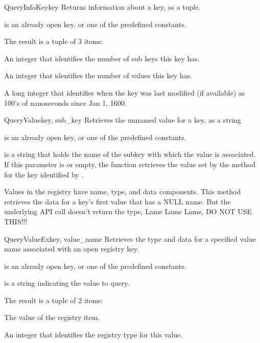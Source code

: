 \begin{funcdesc}{QueryInfoKey}{key}
 Returns information about a key, as a tuple.

  is an already open key, or one of the predefined 
  constants.

 The result is a tuple of 3 items:
 \item[num_subkeys]
 An integer that identifies the number of sub keys this key has.
 \item[num_values]
 An integer that identifies the number of values this key has.
 \item [last_modified]
 A long integer that identifies when the key was last modified (if available)
 as 100's of nanoseconds since Jan 1, 1600.
\end{funcdesc}


\begin{funcdesc}{QueryValue}{key, sub_key}
 Retrieves the unnamed value for a key, as a string

  is an already open key, or one of the predefined 
  constants.

  is a string that holds the name of the subkey with which 
 the value is associated.  If this parameter is  or empty, the 
 function retrieves the value set by the  method 
 for the key identified by .

 Values in the registry have name, type, and data components. This 
 method retrieves the data for a key's first value that has a NULL name.
 But the underlying API call doesn't return the type, Lame Lame Lame,
 DO NOT USE THIS!!!
\end{funcdesc}


\begin{funcdesc}{QueryValueEx}{key, value_name}
  Retrieves the type and data for a specified value name associated with 
  an open registry key.
  
  is an already open key, or one of the predefined 
  constants.

  is a string indicating the value to query.

 The result is a tuple of 2 items:
 \item [value]
 The value of the registry item.
 \item [type_id]
 An integer that identifies the registry type for this value.
\end{funcdesc}



